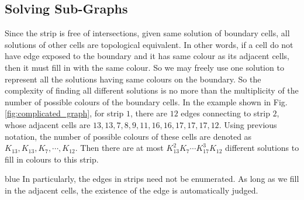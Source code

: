 \documentclass[conference]{IEEEtran}
\begin{document}
\subsection{Solving Sub-Graphs}
Since the strip is free of intersections, given same solution of boundary cells, all solutions of other cells are topological equivalent. 
In other words, if a cell do not have edge exposed to the boundary and it has same colour as its adjacent cells, then it must fill in with the same colour. So we may freely use one solution to represent all the solutions having same colours on the boundary.  
So the complexity of finding all different solutions is no more than the multiplicity of the number of possible colours of the boundary cells. 
In the example shown in Fig.\ref{fig:complicated_graph}, for strip $1$, there are $12$ edges connecting to strip $2$, whose adjacent cells are $13, 13, 7, 8, 9, 11, 16, 16, 17, 17, 17, 12$. 
Using previous notation, the number of possible colours of these cells are denoted as $K_{13}, K_{13}, K_{7}, \cdots, K_{12}$. Then there are at most $K_{13}^2K_{7}\cdots K_{17}^3K_{12}$ different solutions to fill in colours to this strip. 

\begin{color}{blue}
In particularly, the edges in strips need not be enumerated. As long as we fill in the adjacent cells, the existence of the edge is automatically judged. 
\end{color}
\end{document}
